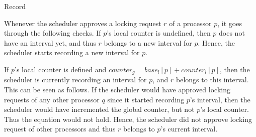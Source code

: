 \begin{algorithm}[!ht]


\caption{Record\label{alg:record}}
\end{algorithm}

Whenever the scheduler approves a locking request $r$ of a processor $p$, it goes through the following checks. If $p$'s local counter is undefined, then $p$ does not have an interval yet, and thus $r$ belongs to a new interval for $p$. Hence, the scheduler starts recording a new interval for $p$. 

If $p$'s local counter is defined and $counter_{g} = base_{l}[p] + counter_{l}[p]$, then the scheduler is currently recording an interval for $p$, and $r$ belongs to this interval. This can be seen as follows. If the scheduler would have approved locking requests of any other processor $q$ since it started recording $p$'s interval, then the scheduler would have incremented the global counter, but not $p$'s local counter. Thus the equation would not hold. Hence, the scheduler did not approve locking request of other processors and thus $r$ belongs to $p$'s current interval. 

